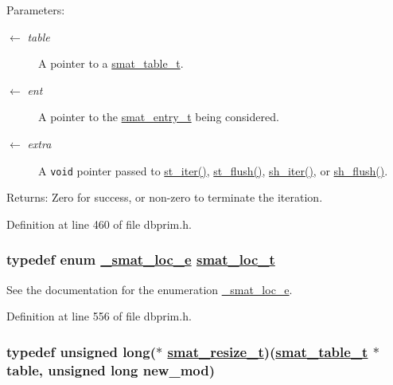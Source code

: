 \begin{Desc}
\item[Parameters:]
\begin{description}
\item[\mbox{$\leftarrow$} {\em table}]A pointer to a \hyperlink{group__dbprim__smat_ga0}{smat\_\-table\_\-t}. \item[\mbox{$\leftarrow$} {\em ent}]A pointer to the \hyperlink{group__dbprim__smat_ga2}{smat\_\-entry\_\-t} being considered. \item[\mbox{$\leftarrow$} {\em extra}]A {\tt void} pointer passed to \hyperlink{group__dbprim__smat_ga16}{st\_\-iter()}, \hyperlink{group__dbprim__smat_ga17}{st\_\-flush()}, \hyperlink{group__dbprim__smat_ga23}{sh\_\-iter()}, or \hyperlink{dbprim_8h_a178}{sh\_\-flush()}.\end{description}
\end{Desc}
\begin{Desc}
\item[Returns:]Zero for success, or non-zero to terminate the iteration.\end{Desc}


Definition at line 460 of file dbprim.h.\hypertarget{group__dbprim__smat_ga6}{
\subsubsection[smat\_\-loc\_\-t]{\setlength{\rightskip}{0pt plus 5cm}typedef enum \hyperlink{group__dbprim__smat_ga70}{\_\-smat\_\-loc\_\-e} \hyperlink{group__dbprim__smat_ga6}{smat\_\-loc\_\-t}}}
\label{group__dbprim__smat_ga6}


See the documentation for the enumeration \hyperlink{group__dbprim__smat_ga70}{\_\-smat\_\-loc\_\-e}.

Definition at line 556 of file dbprim.h.\hypertarget{group__dbprim__smat_ga3}{
\subsubsection[smat\_\-resize\_\-t]{\setlength{\rightskip}{0pt plus 5cm}typedef unsigned long($\ast$ \hyperlink{group__dbprim__smat_ga3}{smat\_\-resize\_\-t})(\hyperlink{struct__smat__table__s}{smat\_\-table\_\-t} $\ast$table, unsigned long new\_\-mod)}}
\label{group__dbprim__smat_ga3}


